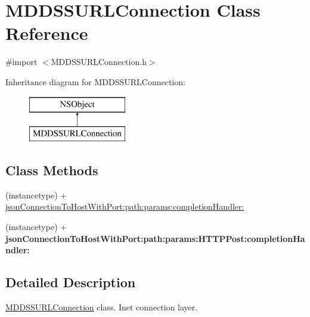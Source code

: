 \hypertarget{interface_m_d_d_s_s_u_r_l_connection}{\section{M\-D\-D\-S\-S\-U\-R\-L\-Connection Class Reference}
\label{interface_m_d_d_s_s_u_r_l_connection}
}


{\ttfamily \#import $<$M\-D\-D\-S\-S\-U\-R\-L\-Connection.\-h$>$}

Inheritance diagram for M\-D\-D\-S\-S\-U\-R\-L\-Connection\-:\begin{figure}[H]
\begin{center}
\leavevmode
\includegraphics[height=2.000000cm]{interface_m_d_d_s_s_u_r_l_connection}
\end{center}
\end{figure}
\subsection*{Class Methods}
\begin{DoxyCompactItemize}
\item 
(instancetype) + \hyperlink{interface_m_d_d_s_s_u_r_l_connection_a4adceb5901feaca4d9f185830628c552}{json\-Connection\-To\-Host\-With\-Port\-:path\-:params\-:completion\-Handler\-:}
\item 
\hypertarget{interface_m_d_d_s_s_u_r_l_connection_af55004ef2d9bc7b4c82178af35d59f71}{(instancetype) + {\bfseries json\-Connection\-To\-Host\-With\-Port\-:path\-:params\-:\-H\-T\-T\-P\-Post\-:completion\-Handler\-:}}\label{interface_m_d_d_s_s_u_r_l_connection_af55004ef2d9bc7b4c82178af35d59f71}

\end{DoxyCompactItemize}


\subsection{Detailed Description}
\hyperlink{interface_m_d_d_s_s_u_r_l_connection}{M\-D\-D\-S\-S\-U\-R\-L\-Connection} class. Inet connection layer. 

